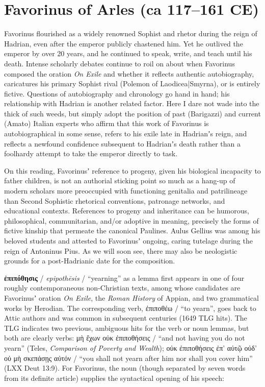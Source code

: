 %
%
\chapter{Favorinus of Arles (ca 117--161 CE)}%
\vspace*{3mm} %
\justifying %

\noindent{}Favorinus flourished as a widely renowned Sophist and rhetor %
during the reign of Hadrian, even after the emperor publicly chastened him. %
Yet he outlived the emperor by over 20 years, %
and he continued to speak, write, and teach until his death. %
Intense scholarly debates continue to roil on about when Favorinus %
composed the oration \textit{On Exile} and %
whether it reflects authentic autobiography, %
caricatures his primary Sophist rival (Polemon of Laodicea|Smyrna), %
or is entirely fictive. %
Questions of autobiography and chronology go hand in hand; %
his relationship with Hadrian is another related factor. %
Here I dare not wade into the thick of such weeds, %
but simply adopt the position of past (Barigazzi) and current (Amato) Italian experts %
who affirm that this work of Favorinus is autobiographical in some sense, %
refers to his exile late in Hadrianʼs reign, %
and reflects a newfound confidence subsequent to Hadrianʼs death %
rather than a foolhardy attempt to take the emperor directly to task. %

On this reading, Favorinusʼ reference to progeny, %
given his biological incapacity to father children, %
is not an authorial sticking point so much as a hang-up %
of modern scholars more preoccupied with functioning genitalia %
and patrilineage than Second Sophistic rhetorical conventions, %
patronage networks, and educational contexts. %
References to progeny and inheritance can be humorous, %
philosophical, communitarian, and/or adoptive in meaning, %
precisely the forms of fictive kinship that permeate the canonical Paulines. %
Aulus Gellius was among his beloved students %
and attested to Favorinusʼ ongoing, caring tutelage during %
the reign of Antoninus Pius. %
As we will soon see, there may also be neologistic grounds for a post-Hadrianic %
date for the composition. \clearpage %

\noindent{}\textbf{ἐπιπόθησις} / \textit{epipothēsis} / “yearning” as a lemma %
first appears in one of four roughly contemporaneous non-Christian texts, %
among whose candidates are Favorinusʼ oration \textit{On Exile}, %
the \textit{Roman History} of Appian, %
and two grammatical works by Herodian. %
The corresponding verb, ἐπιποθέω / “to yearn”, goes back to Attic authors %
and was common in subsequent centuries (1649 TLG hits). %
The TLG indicates two previous, ambiguous hits for the verb or noun lemmas, %
but both are clearly verbs: %
μὴ ἔχων οὐκ ἐπιποθήσεις / “and not having you do not yearn” %
(Teles, \textit{Comparison of Poverty and Wealth}); %
οὐκ ἐπιποθήσεις ἐπ’ αὐτῷ οὐδ’ οὐ μὴ σκεπάσῃς αὐτόν / “you shall not %
yearn after him nor shall you cover him” (LXX Deut 13:9). %
For Favorinus, %
the noun (though separated by seven words from its definite article) %
supplies the syntactical opening of his speech: 


